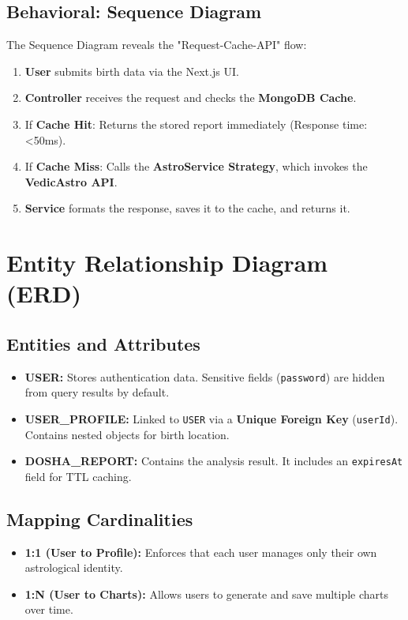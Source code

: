 \documentclass[12pt,a4paper]{article}
\begin{document}
\subsection{Behavioral: Sequence Diagram}
The Sequence Diagram reveals the "Request-Cache-API" flow:
\begin{enumerate}
    \item \textbf{User} submits birth data via the Next.js UI.
    \item \textbf{Controller} receives the request and checks the \textbf{MongoDB Cache}.
    \item If \textbf{Cache Hit}: Returns the stored report immediately (Response time: <50ms).
    \item If \textbf{Cache Miss}: Calls the \textbf{AstroService Strategy}, which invokes the \textbf{VedicAstro API}.
    \item \textbf{Service} formats the response, saves it to the cache, and returns it.
\end{enumerate}

\section{Entity Relationship Diagram (ERD)}

\subsection{Entities and Attributes}
\begin{itemize}
    \item \textbf{USER:} Stores authentication data. Sensitive fields (\texttt{password}) are hidden from query results by default.
    \item \textbf{USER\_PROFILE:} Linked to \texttt{USER} via a \textbf{Unique Foreign Key} (\texttt{userId}). Contains nested objects for birth location.
    \item \textbf{DOSHA\_REPORT:} Contains the analysis result. It includes an \texttt{expiresAt} field for TTL caching.
\end{itemize}

\subsection{Mapping Cardinalities}
\begin{itemize}
    \item \textbf{1:1 (User to Profile):} Enforces that each user manages only their own astrological identity.
    \item \textbf{1:N (User to Charts):} Allows users to generate and save multiple charts over time.
\end{itemize}
\end{document}

